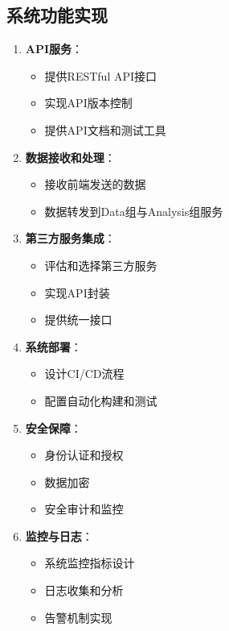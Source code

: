 \documentclass[a4paper,12pt]{article}
\begin{document}
\subsection{系统功能实现}

\begin{enumerate}
  \item \textbf{API服务}：
    \begin{itemize}
      \item 提供RESTful API接口
      \item 实现API版本控制
      \item 提供API文档和测试工具
    \end{itemize}
  
  \item \textbf{数据接收和处理}：
    \begin{itemize}
      \item 接收前端发送的数据
      \item 数据转发到Data组与Analysis组服务
    \end{itemize}
  
  \item \textbf{第三方服务集成}：
    \begin{itemize}
      \item 评估和选择第三方服务
      \item 实现API封装
      \item 提供统一接口
    \end{itemize}
  
  \item \textbf{系统部署}：
    \begin{itemize}
      \item 设计CI/CD流程
      \item 配置自动化构建和测试
    \end{itemize}
  
  \item \textbf{安全保障}：
    \begin{itemize}
      \item 身份认证和授权
      \item 数据加密
      \item 安全审计和监控
    \end{itemize}
  
  \item \textbf{监控与日志}：
    \begin{itemize}
      \item 系统监控指标设计
      \item 日志收集和分析
      \item 告警机制实现
    \end{itemize}
\end{enumerate}
\end{document}
